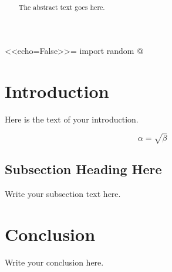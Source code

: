 \documentclass[12pt]{exam}
\begin{document}
<<echo=False>>=
import random
@

\title{ }
\author{ }

\maketitle

\begin{abstract}

The abstract text goes here.
\end{abstract}

\section{Introduction}
Here is the text of your introduction.

\begin{equation}
    \label{simple_equation}
    \alpha = \sqrt{ \beta }
\end{equation}

\subsection{Subsection Heading Here}
Write your subsection text here.

\section{Conclusion}
Write your conclusion here.

\begin{questions}
\end{questions}
\end{document}
